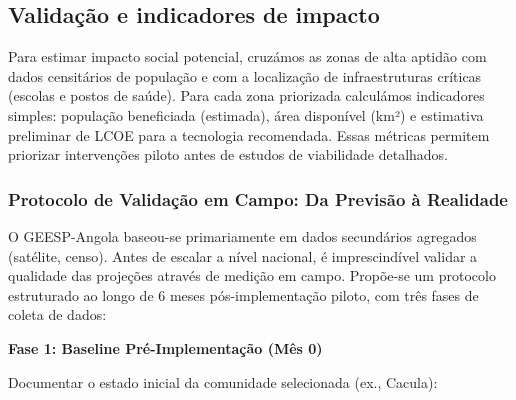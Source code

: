\documentclass[12pt, a4paper]{article}
\begin{document}
\subsection{Validação e indicadores de impacto}

Para estimar impacto social potencial, cruzámos as zonas de alta aptidão com dados censitários de população e com a localização de infraestruturas críticas (escolas e postos de saúde). Para cada zona priorizada calculámos indicadores simples: população beneficiada (estimada), área disponível (km²) e estimativa preliminar de LCOE para a tecnologia recomendada. Essas métricas permitem priorizar intervenções piloto antes de estudos de viabilidade detalhados.

\subsubsection{Protocolo de Validação em Campo: Da Previsão à Realidade}

O GEESP-Angola baseou-se primariamente em dados secundários agregados (satélite, censo). 
Antes de escalar a nível nacional, é imprescindível validar a qualidade das projeções 
através de medição em campo. Propõe-se um protocolo estruturado ao longo de 6 meses 
pós-implementação piloto, com três fases de coleta de dados:

\textbf{Fase 1: Baseline Pré-Implementação (Mês 0)}

Documentar o estado inicial da comunidade selecionada (ex., Cacula):
\end{document}
